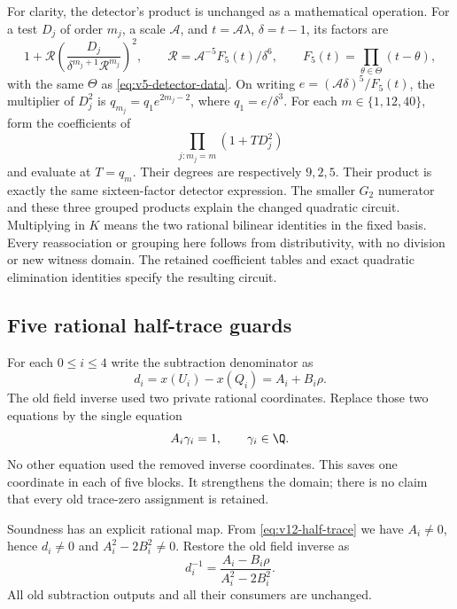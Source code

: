 For clarity, the detector's product is unchanged as a mathematical
operation.  For a test $D_j$ of order $m_j$, a scale $\mathcal A$, and
$t=\mathcal A\lambda$, $\delta=t-1$, its factors are
\[
 1+\mathcal R\left(\frac{D_j}{\delta^{m_j+1}\mathcal R^{m_j}}\right)^2,
 \qquad
 \mathcal R=\mathcal A^{-5}F_5(t)/\delta^6,
 \qquad F_5(t)=\prod_{\theta\in\Theta}(t-\theta),
\]
with the same $\Theta$ as \eqref{eq:v5-detector-data}.  On writing
$e=(\mathcal A\delta)^5/F_5(t)$, the multiplier of $D_j^2$ is
$q_{m_j}=q_1e^{2m_j-2}$, where $q_1=e/\delta^3$.
For each $m\in\{1,12,40\}$, form the coefficients of
\[
 \prod_{j:m_j=m}(1+TD_j^2)
\]
and evaluate at $T=q_m$.  Their degrees are respectively $9,2,5$.
Their product is exactly the same sixteen-factor detector expression.
The smaller $G_2$ numerator and these three grouped products explain
the changed quadratic circuit.  Multiplying in $K$ means the two
rational bilinear identities in the fixed basis.  Every reassociation
or grouping here follows from distributivity, with no division or
new witness domain.  The retained coefficient tables and exact
quadratic elimination identities specify the resulting circuit.

\subsection{Five rational half-trace guards}\label{subsec:v12-guards}

For each $0\le i\le4$ write the subtraction denominator as
\[
 d_i=x(U_i)-x(Q_i)=A_i+B_i\rho.
\]
The old field inverse used two private rational coordinates.  Replace
those two equations by the single equation
\begin{equation}\label{eq:v12-half-trace}
 A_i\gamma_i=1,\qquad\gamma_i\in\Q.
\end{equation}
No other equation used the removed inverse coordinates.  This saves
one coordinate in each of five blocks.  It strengthens the domain;
there is no claim that every old trace-zero assignment is retained.

Soundness has an explicit rational map.  From \eqref{eq:v12-half-trace}
we have $A_i\ne0$, hence $d_i\ne0$ and
$A_i^2-2B_i^2\ne0$.  Restore the old field inverse as
\[
 d_i^{-1}=\frac{A_i-B_i\rho}{A_i^2-2B_i^2}.
\]
All old subtraction outputs and all their consumers are unchanged.

